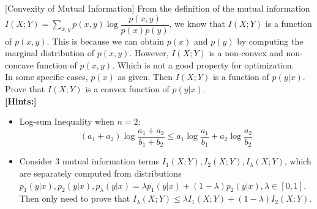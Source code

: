 \item {} [Convexity of Mutual Information] From the definition of the mutual information $I(X;Y)=\sum\limits_{x,y}p(x,y)\log\dfrac{p(x,y)}{p(x)p(y)}$, we know that $I(X;Y)$ is a function of $p(x,y)$. This is because we can obtain $p(x)$ and $p(y)$ by computing the marginal distribution of $p(x,y)$. However, $I(X;Y)$ is a non-convex and non-concave function of $p(x,y)$. Which is not a good property for optimization. \\
In some specific cases, $p(x)$ as given. Then $I(X;Y)$ is a function of $p(y|x)$. Prove that $I(X;Y)$ is a convex function of $p(y|x)$. \\
\textbf{[Hints:]}
\begin{itemize}
\item Log-sum Inequality when $n=2$:
$$(a_1+a_2)\log\dfrac{a_1+a_2}{b_1+b_2}\leq a_1\log\dfrac{a_1}{b_1}+a_2\log\dfrac{a_2}{b_2}$$
\item Consider $3$ mutual information terms $I_1(X;Y), I_2(X;Y), I_{\lambda}(X;Y)$, which are separately computed from distributions $p_1(y|x), p_2(y|x), p_{\lambda}(y|x)=\lambda p_1(y|x)+(1-\lambda)p_2(y|x), \lambda\in[0,1]$. Then only need to prove that $I_{\lambda}(X;Y)\leq \lambda I_1(X;Y)+(1-\lambda)I_2(X;Y)$.
\end{itemize}

\solution






\newpage